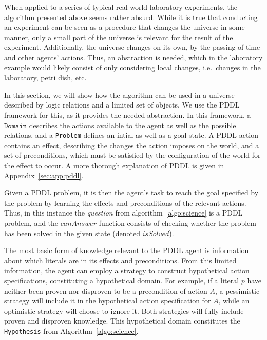 \documentclass[../Master.tex]{subfiles}
\begin{document}
When applied to a series of typical real-world laboratory experiments, the algorithm presented above seems rather absurd. While it is true that conducting an experiment can be seen as a procedure that changes the universe in some manner, only a small part of the universe is relevant for the result of the experiment. Additionally, the universe changes on its own, by the passing of time and other agents' actions. Thus, an abstraction is needed, which in the laboratory example would likely consist of only considering local changes, i.e.\ changes in the laboratory, petri dish, etc. 

In this section, we will show how the algorithm can be used in a universe described by logic relations and a limited set of objects. We use the PDDL framework for this, as it provides the needed abstraction. In this framework, a $\texttt{Domain}$ describes the actions available to the agent as well as the possible relations, and a \texttt{Problem} defines an intial as well as a goal state. A PDDL action contains an effect, describing the changes the action imposes on the world, and a set of preconditions, which must be satisfied by the configuration of the world for the effect to occur. A more thorough explanation of PDDL is given in Appendix~\ref{sec:app:pddl}.

%

Given a PDDL problem, it is then the agent's task to reach the goal specified by the problem by learning the effects and preconditions of the relevant actions. Thus, in this instance the \textit{question} from algorithm~\ref{algo:science} is a PDDL problem, and the $canAnswer$ function consists of checking whether the problem has been solved in the given state (denoted $isSolved$).

The most basic form of knowledge relevant to the PDDL agent is information about which literals are in its effects and preconditions. From this limited information, the agent can employ a strategy to construct hypothetical action specifications, constituting a hypothetical domain. For example, if a literal $p$ have neither been proven nor disproven to be a precondition of action $A$, a pessimistic strategy will include it in the hypothetical action specification for $A$, while an optimistic strategy will choose to ignore it. Both strategies will fully include proven and disproven knowledge. This hypothetical domain constitutes the \texttt{Hypothesis} from Algorithm~\ref{algo:science}.
\end{document}
